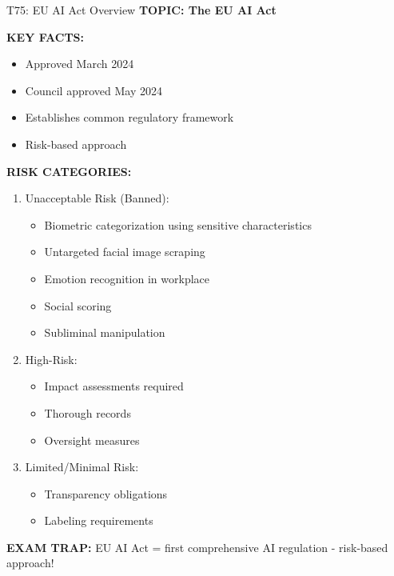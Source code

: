 \documentclass[8pt]{beamer}
\begin{document}
	\begin{frame}{T75: EU AI Act Overview}
		\fontsize{6.5}{7.5}\selectfont
		\textbf{TOPIC: The EU AI Act}
		
		\vspace{0.1cm}
		\textbf{KEY FACTS:}
		\begin{itemize}
			\item Approved March 2024
			\item Council approved May 2024
			\item Establishes common regulatory framework
			\item Risk-based approach
		\end{itemize}
		
		\vspace{0.1cm}
		\textbf{RISK CATEGORIES:}
		\begin{enumerate}
			\item \textcolor{myblue}{Unacceptable Risk (Banned):}
			\begin{itemize}
				\item Biometric categorization using sensitive characteristics
				\item Untargeted facial image scraping
				\item Emotion recognition in workplace
				\item Social scoring
				\item Subliminal manipulation
			\end{itemize}
			\item \textcolor{myblue}{High-Risk:}
			\begin{itemize}
				\item Impact assessments required
				\item Thorough records
				\item Oversight measures
			\end{itemize}
			\item \textcolor{myblue}{Limited/Minimal Risk:}
			\begin{itemize}
				\item Transparency obligations
				\item Labeling requirements
			\end{itemize}
		\end{enumerate}
		
		\textcolor{myred}{\textbf{EXAM TRAP:}} EU AI Act = \textcolor{myblue}{first comprehensive AI regulation} - risk-based approach!
	\end{frame}
	
\end{document}
